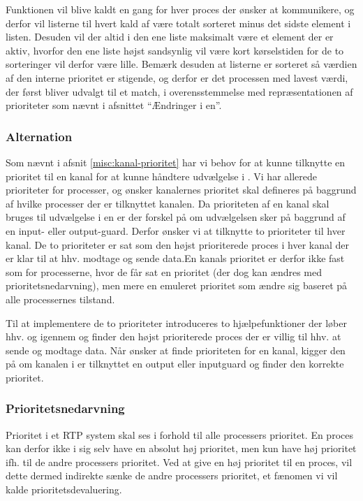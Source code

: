 Funktionen  vil blive kaldt en gang for hver proces der ønsker at kommunikere, og derfor vil listerne til hvert kald af  være totalt sorteret minus det sidste element i listen. Desuden vil der altid i den ene liste maksimalt være et element der er aktiv, hvorfor den ene liste højst sandsynlig vil være kort kørselstiden for de to sorteringer vil derfor være lille. Bemærk desuden at listerne er sorteret så værdien af den interne prioritet er stigende, og derfor er det processen med lavest værdi, der først bliver udvalgt til et match, i overensstemmelse med repræsentationen af prioriteter som nævnt i afsnittet ``Ændringer i \sched en''.

\subsubsection*{Alternation}

Som nævnt i afsnit \cref{misc:kanal-prioritet} har vi behov for at kunne tilknytte en prioritet til en kanal for at kunne håndtere udvælgelse i . Vi har allerede prioriteter for processer, og ønsker  kanalernes prioritet skal defineres på baggrund af hvilke processer der er tilknyttet kanalen. Da prioriteten af en kanal skal bruges til udvælgelse i en  er der forskel på om udvælgelsen sker på baggrund af en  input- eller output-guard. Derfor ønsker vi at tilknytte to prioriteter til hver kanal.  De to prioriteter er sat som  den højst prioriterede proces i hver kanal der er klar til at hhv. modtage og sende data.En kanals prioritet er derfor ikke fast som for processerne, hvor de får sat en prioritet (der dog kan ændres med prioritetsnedarvning), men mere en emuleret prioritet som ændre sig baseret på alle processernes tilstand. 

Til at implementere de to prioriteter introduceres  to hjælpefunktioner der løber hhv.  og  igennem og  finder den højst prioriterede proces der er villig til hhv. at sende og modtage data. Når   ønsker at finde prioriteten for en kanal, kigger den på om kanalen i  er tilknyttet en output eller inputguard og finder den korrekte prioritet.


\subsubsection*{Prioritetsnedarvning}
Prioritet i et RTP system skal ses i forhold til alle processers prioritet. En proces kan derfor ikke i sig selv have en absolut høj prioritet, men kun have høj prioritet ifh. til de andre processers prioritet. Ved at give en høj prioritet til  en proces, vil dette dermed  indirekte sænke de andre processers prioritet, et fænomen vi vil kalde prioritetsdevaluering.

